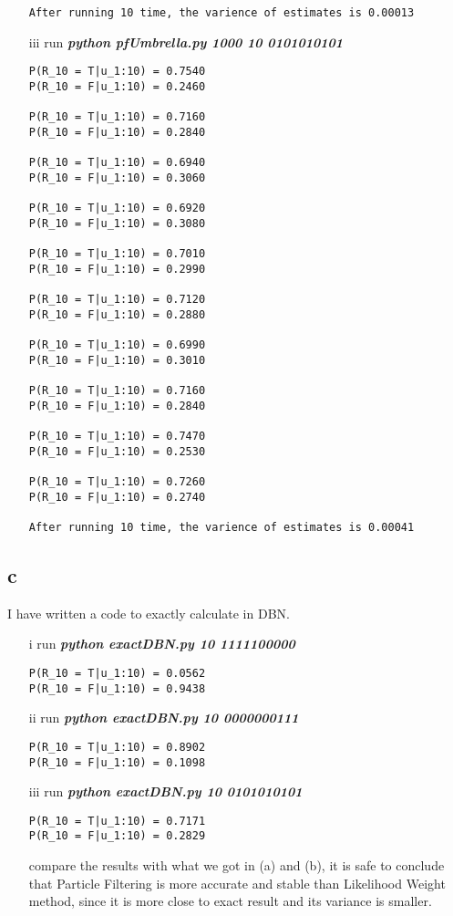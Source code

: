 \documentclass[12pt]{amsart}
\begin{document}
\begin{itemize}
\begin{verbatim}
After running 10 time, the varience of estimates is 0.00013
\end{verbatim}
\item[iii] run \textit{\textbf{python pfUmbrella.py 1000 10 0101010101}}
\begin{verbatim}
P(R_10 = T|u_1:10) = 0.7540
P(R_10 = F|u_1:10) = 0.2460

P(R_10 = T|u_1:10) = 0.7160
P(R_10 = F|u_1:10) = 0.2840

P(R_10 = T|u_1:10) = 0.6940
P(R_10 = F|u_1:10) = 0.3060

P(R_10 = T|u_1:10) = 0.6920
P(R_10 = F|u_1:10) = 0.3080

P(R_10 = T|u_1:10) = 0.7010
P(R_10 = F|u_1:10) = 0.2990

P(R_10 = T|u_1:10) = 0.7120
P(R_10 = F|u_1:10) = 0.2880

P(R_10 = T|u_1:10) = 0.6990
P(R_10 = F|u_1:10) = 0.3010

P(R_10 = T|u_1:10) = 0.7160
P(R_10 = F|u_1:10) = 0.2840

P(R_10 = T|u_1:10) = 0.7470
P(R_10 = F|u_1:10) = 0.2530

P(R_10 = T|u_1:10) = 0.7260
P(R_10 = F|u_1:10) = 0.2740

After running 10 time, the varience of estimates is 0.00041
\end{verbatim}
\end{itemize}
\subsection*{c}
I have written a code to exactly calculate in DBN.
\begin{itemize}
\item[i] run \textit{\textbf{python exactDBN.py 10 1111100000}} 
\begin{verbatim}
P(R_10 = T|u_1:10) = 0.0562
P(R_10 = F|u_1:10) = 0.9438
\end{verbatim}

\item[ii] run \textit{\textbf{python exactDBN.py 10 0000000111}} 
\begin{verbatim}
P(R_10 = T|u_1:10) = 0.8902
P(R_10 = F|u_1:10) = 0.1098
\end{verbatim}
\item[iii] run \textit{\textbf{python exactDBN.py 10 0101010101}} 
\begin{verbatim}
P(R_10 = T|u_1:10) = 0.7171
P(R_10 = F|u_1:10) = 0.2829
\end{verbatim}
compare the results with what we got in (a) and (b), it is safe to conclude that Particle Filtering is more accurate and stable than Likelihood Weight method, since it is more close to exact result and its variance is smaller.
\end{itemize}
\end{document}
